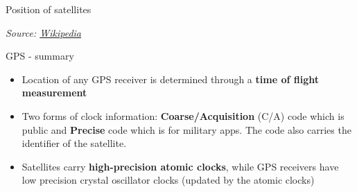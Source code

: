 \documentclass[compress]{beamer}
\newcommand{\source}[2]{{\tiny\it Source: \href{#1}{#2}}}
\begin{document}
\begin{frame}{Position of satellites}

    \begin{center}

    \source{https://en.wikipedia.org/wiki/File:GPS24goldenSML.gif}{Wikipedia}
    \end{center}


\end{frame}

\begin{frame}{GPS - summary}

\begin{itemize}

    \item Location of any GPS receiver is determined through a {\bf time of flight
        measurement}
\item Two forms of clock information: {\bf Coarse/Acquisition} (C/A) code which is
    public and {\bf Precise} code which is for military apps. The code also
  carries the identifier of the satellite.
\item Satellites carry {\bf high-precision atomic clocks}, while GPS receivers
  have low precision crystal oscillator clocks (updated by the atomic
  clocks)
\end{itemize}

\end{frame}
\end{document}
